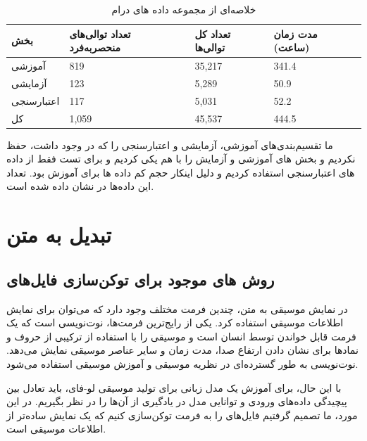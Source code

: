 \begin{table}[!ht]
      \centering
      \begin{tabular}{|l|l|l|l|}
            \hline
            بخش        & تعداد توالی‌های منحصربه‌فرد & تعداد کل توالی‌ها & مدت زمان (ساعت) \\ \hline
            آموزشی     & 819                       & 35,217           & 341.4           \\ \hline
            آزمایشی    & 123                       & 5,289            & 50.9            \\ \hline
            اعتبارسنجی & 117                       & 5,031            & 52.2            \\ \hline
            کل         & 1,059                     & 45,537           & 444.5           \\ \hline
      \end{tabular}
      \caption{خلاصه‌ای از مجموعه داده های درام}
      \label{drumInfo}
\end{table}

ما تقسیم‌بندی‌های آموزشی، آزمایشی و اعتبارسنجی را که در  وجود داشت، حفظ
نکردیم و بخش های آموزشی و آزمایش را با هم یکی کردیم و برای تست فقط از داده های اعتبارسنجی استفاده کردیم و دلیل اینکار حجم کم داده ها برای آموزش بود. تعداد این داده‌ها در  نشان داده شده است.

\section{تبدیل  به متن}\label{se:tokenizer}

\subsection{روش های موجود برای توکن‌سازی فایل‌های }

در نمایش موسیقی به متن، چندین فرمت مختلف وجود دارد که می‌توان برای نمایش اطلاعات
موسیقی استفاده کرد. یکی از رایج‌ترین فرمت‌ها، نوت‌نویسی  است
که یک فرمت قابل خواندن توسط انسان است و موسیقی را با استفاده از ترکیبی
از حروف و نمادها برای نشان دادن ارتفاع صدا، مدت زمان و سایر عناصر موسیقی
نمایش می‌دهد. نوت‌نویسی  به طور گسترده‌ای در نظریه موسیقی و آموزش موسیقی
استفاده می‌شود.

با این حال، برای آموزش یک مدل زبانی برای تولید موسیقی
لو-فای، باید تعادل بین پیچیدگی داده‌های ورودی و توانایی مدل در
یادگیری از آن‌ها را در نظر بگیریم. در این مورد، ما تصمیم گرفتیم فایل‌های
 را به فرمت  توکن‌سازی کنیم که یک نمایش ساده‌تر از
اطلاعات موسیقی است.

